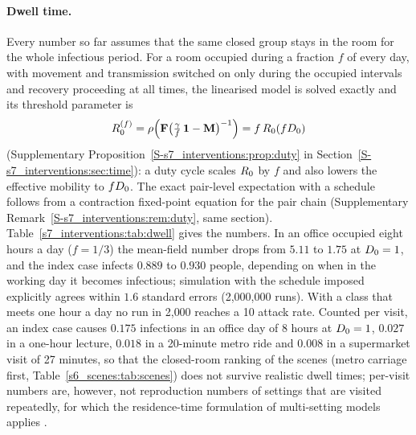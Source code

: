 \paragraph{Dwell time.} Every number so far assumes that the same closed group stays in the room for the whole
infectious period. For a room occupied during a fraction $f$ of every day, with movement and transmission
switched on only during the occupied intervals and recovery proceeding at all times, the linearised model is
solved exactly and its threshold parameter is
\begin{equation}\label{s7_interventions:eq:duty}
  R_0^{(f)}=\rho\Bigl(\mathbf{F}\bigl(\tfrac{\gamma}{f}\,\mathbf{1}-\mathbf{M}\bigr)^{-1}\Bigr)=f\,R_0(fD_0)
\end{equation}
(Supplementary Proposition~\ref{S-s7_interventions:prop:duty} in Section~\ref{S-s7_interventions:sec:time}): a duty cycle scales $R_0$ by $f$ and also lowers
the effective mobility to $fD_0$. The exact pair-level expectation with a schedule follows from a contraction
fixed-point equation for the pair chain (Supplementary Remark~\ref{S-s7_interventions:rem:duty}, same section).
Table~\ref{s7_interventions:tab:dwell} gives the numbers. In an office occupied eight hours a day ($f=1/3$) the
mean-field number drops from $5.11$ to $1.75$ at $D_0=1$, and the index case infects $0.889$ to $0.930$ people,
depending on when in the working day it becomes infectious; simulation with the schedule imposed explicitly
agrees within $1.6$ standard errors (2{,}000{,}000 runs). With a class that meets one hour a day no run in
2{,}000 reaches a 10\pct{} attack rate. Counted per visit, an index case causes $0.175$ infections in an office
day of 8 hours at $D_0=1$, $0.027$ in a one-hour lecture, $0.018$ in a 20-minute metro ride and $0.008$ in a
supermarket visit of 27 minutes, so that the closed-room ranking of the scenes (metro carriage first,
Table~\ref{s6_scenes:tab:scenes}) does not survive realistic dwell times; per-visit numbers are, however, not
reproduction numbers of settings that are visited repeatedly, for which the residence-time formulation of
multi-setting models applies \citep{bichara2015sis}.


